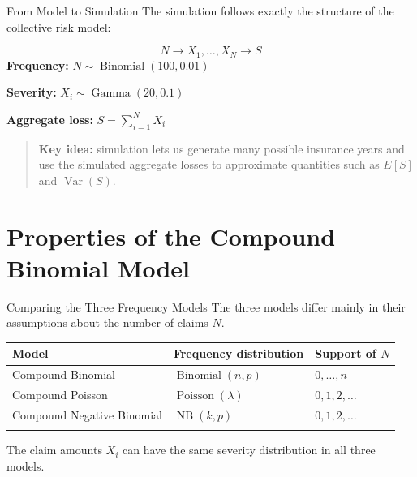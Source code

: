 \documentclass[
  ignorenonframetext,
  aspectratio=169,
]{beamer}
\newcounter{none} %
\begin{document}
\begin{frame}{From Model to Simulation}
\protect{}\label{from-model-to-simulation}
The simulation follows exactly the structure of the collective risk
model:

\[
\boxed{
N
\longrightarrow
X_1,\ldots,X_N
\longrightarrow
S
}
\] \textbf{Frequency:} \(N\sim\operatorname{Binomial}(100,0.01)\)

\textbf{Severity:} \(X_i\sim\operatorname{Gamma}(20,0.1)\)

\textbf{Aggregate loss:} \(S=\sum_{i=1}^{N}X_i\)

\begin{quote}
\textbf{Key idea:} simulation lets us generate many possible insurance
years and use the simulated aggregate losses to approximate quantities
such as \(E[S]\) and \(\operatorname{Var}(S)\).
\end{quote}
\end{frame}

\section{Properties of the Compound Binomial
Model}\label{properties-of-the-compound-binomial-model}

\begin{frame}{Comparing the Three Frequency Models}
\protect{}\label{comparing-the-three-frequency-models}
The three models differ mainly in their assumptions about the number of
claims \(N\).

{\def\LTcaptype{none} %
\begin{longtable}[]{@{}
  >{\raggedright\arraybackslash}p{}
  >{\raggedright\arraybackslash}p{}
  >{\raggedright\arraybackslash}p{}@{}}
\toprule\noalign{}
\begin{minipage}[b]{\linewidth}\raggedright
Model
\end{minipage} & \begin{minipage}[b]{\linewidth}\raggedright
Frequency distribution
\end{minipage} & \begin{minipage}[b]{\linewidth}\raggedright
Support of \(N\)
\end{minipage} \\
\midrule\noalign{}
\endhead
Compound Binomial & \(\operatorname{Binomial}(n,p)\) & \(0,\ldots,n\) \\
Compound Poisson & \(\operatorname{Poisson}(\lambda)\) &
\(0,1,2,\ldots\) \\
Compound Negative Binomial & \(\operatorname{NB}(k,p)\) &
\(0,1,2,\ldots\) \\
\bottomrule\noalign{}
\end{longtable}
}

The claim amounts \(X_i\) can have the same severity distribution in all
three models.
\end{frame}
\end{document}
